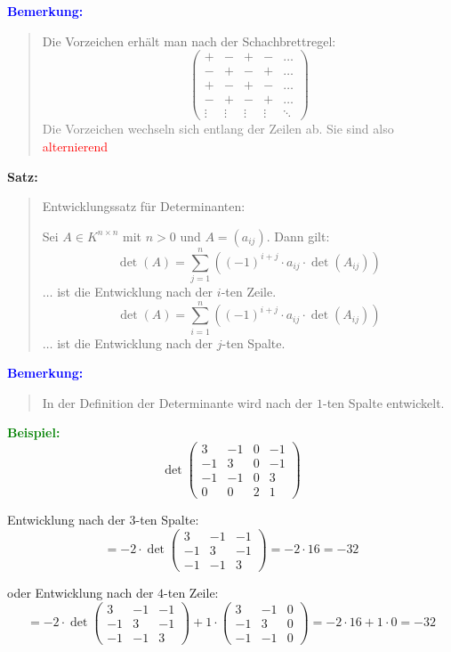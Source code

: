 \documentclass{article}
\newcommand{\red}[1]{\textcolor{red}{#1}}
\newcommand{\gray}[1]{\textcolor{gray}{#1}}
\newcommand{\blue}[1]{\textcolor{blue}{#1}}
\newcommand{\green}[1]{\textcolor{green}{#1}}
\newcommand{\dgr}[1]{\textcolor{dgr}{#1}}
\newcommand{\ex}{\green{\textbf{Beispiel: }}}
\newcommand{\an}[1]{\blue{\textbf{Bemerkung: }}\begin{quote}#1\end{quote}}
\newcommand{\se}[1]{\dgr{\textbf{Satz: }}\begin{quote}#1\end{quote}}
\begin{document}
\an{
    Die Vorzeichen erhält man nach der Schachbrettregel:
    $$\begin{pmatrix}
        + & - & + & - & \dots\\
        - & + & - & + & \dots\\
        + & - & + & - & \dots\\
        - & + & - & + & \dots\\
        \vdots & \vdots & \vdots & \vdots & \ddots
    \end{pmatrix}$$
    \gray{Die Vorzeichen wechseln sich entlang der Zeilen ab. Sie sind also \red{alternierend}}
}

\se{
    Entwicklungssatz für Determinanten:

    Sei $A \in K^{n \times n}$ mit $n > 0$ und $A = (a_{ij})$. Dann gilt:
    \[
        \det(A) = \sum_{j = 1}^{n}((-1)^{i+j} \cdot a_{ij} \cdot \det(A_{ij}))
    \]
    $\dots$ ist die Entwicklung nach der $i$-ten Zeile.
    \[
        \det(A) = \sum_{i = 1}^{n}((-1)^{i+j} \cdot a_{ij} \cdot \det(A_{ij}))
    \]
    $\dots$ ist die Entwicklung nach der $j$-ten Spalte.
}

\an{
    In der Definition der Determinante wird nach der $1$-ten Spalte entwickelt.
}

\ex \[
    \det \begin{pmatrix}
        3 & -1 & 0 & -1\\
        -1 & 3 & 0 & -1\\
        -1 & -1 & 0 & 3\\
        0 & 0 & 2 & 1
    \end{pmatrix}
\]

Entwicklung nach der $3$-ten Spalte:
\[
    = - 2 \cdot \det \begin{pmatrix}
        3 & -1 & -1\\
        -1 & 3 & -1\\
        -1 & -1 & 3
    \end{pmatrix} = -2 \cdot 16 = -32
\]

oder Entwicklung nach der $4$-ten Zeile:
\[
    = - 2 \cdot \det \begin{pmatrix}
        3 & -1 & -1\\
        -1 & 3 & -1\\
        -1 & -1 & 3
    \end{pmatrix} + 1 \cdot \begin{pmatrix}
        3 & -1 & 0\\
        -1 & 3 & 0\\
        -1 & -1 & 0
    \end{pmatrix} = -2 \cdot 16 + 1 \cdot 0 = -32
\]
\end{document}
